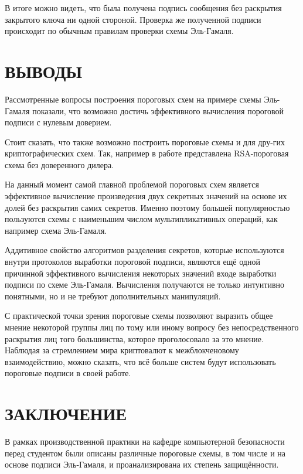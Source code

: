 \documentclass[a4paper,12pt]{article}
\theoremstyle{definition}
\begin{document}
		В итоге можно видеть, что была получена подпись сообщения без раскрытия закрытого ключа ни одной стороной. Проверка же полученной подписи происходит по обычным правилам проверки схемы Эль-Гамаля.
		


	\newpage
	\section*{ВЫВОДЫ}
	
	Рассмотренные вопросы построения пороговых схем на примере схемы Эль-Гамаля показали, что возможно достичь эффективного вычисления пороговой подписи с нулевым доверием. 
	
	Стоит сказать, что также возможно построить пороговые схемы и для дру-гих криптографических схем. Так, например в работе \cite{paper8} представлена RSA-пороговая схема без доверенного дилера. 
	
	На данный момент самой главной проблемой пороговых схем является эффективное вычисление произведения двух секретных значений на основе их долей без раскрытия самих секретов. Именно поэтому большей популярностью пользуются схемы с наименьшим числом мультипликативных операций, как например схема Эль-Гамаля.
	
	Аддитивное свойство алгоритмов разделения секретов, которые используются внутри протоколов выработки пороговой подписи, являются ещё одной причинной эффективного вычисления некоторых значений входе выработки подписи по схеме Эль-Гамаля. Вычисления получаются не только интуитивно понятными, но и не требуют дополнительных манипуляций.
	
	С практической точки зрения пороговые схемы позволяют выразить общее мнение некоторой группы лиц по тому или иному вопросу без непосредственного раскрытия лиц того большинства, которое проголосовало за это мнение. Наблюдая за стремлением мира криптовалют к межблокченовому взаимодействию, можно сказать, что всё больше систем будут использовать пороговые подписи в своей работе.
	
	
	\newpage
	\section*{ЗАКЛЮЧЕНИЕ}
	
	В рамках производственной практики на кафедре компьютерной безопасности перед студентом были описаны различные пороговые схемы, в том числе и на основе подписи Эль-Гамаля, и проанализирована их степень защищённости.
	
\end{document}
